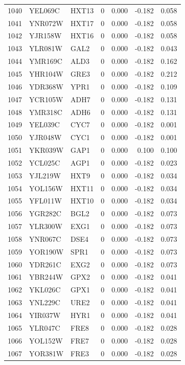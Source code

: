 \begin{longtable}{rllrrrr}
1040 & YEL069C & HXT13 & 0 & 0.000 & -0.182 & 0.058\\
1041 & YNR072W & HXT17 & 0 & 0.000 & -0.182 & 0.058\\
1042 & YJR158W & HXT16 & 0 & 0.000 & -0.182 & 0.058\\
1043 & YLR081W & GAL2 & 0 & 0.000 & -0.182 & 0.043\\
1044 & YMR169C & ALD3 & 0 & 0.000 & -0.182 & 0.162\\
1045 & YHR104W & GRE3 & 0 & 0.000 & -0.182 & 0.212\\
1046 & YDR368W & YPR1 & 0 & 0.000 & -0.182 & 0.109\\
1047 & YCR105W & ADH7 & 0 & 0.000 & -0.182 & 0.131\\
1048 & YMR318C & ADH6 & 0 & 0.000 & -0.182 & 0.131\\
1049 & YEL039C & CYC7 & 0 & 0.000 & -0.182 & 0.001\\
1050 & YJR048W & CYC1 & 0 & 0.000 & -0.182 & 0.001\\
1051 & YKR039W & GAP1 & 0 & 0.000 & 0.100 & 0.100\\
1052 & YCL025C & AGP1 & 0 & 0.000 & -0.182 & 0.023\\
1053 & YJL219W & HXT9 & 0 & 0.000 & -0.182 & 0.034\\
1054 & YOL156W & HXT11 & 0 & 0.000 & -0.182 & 0.034\\
1055 & YFL011W & HXT10 & 0 & 0.000 & -0.182 & 0.034\\
1056 & YGR282C & BGL2 & 0 & 0.000 & -0.182 & 0.073\\
1057 & YLR300W & EXG1 & 0 & 0.000 & -0.182 & 0.073\\
1058 & YNR067C & DSE4 & 0 & 0.000 & -0.182 & 0.073\\
1059 & YOR190W & SPR1 & 0 & 0.000 & -0.182 & 0.073\\
1060 & YDR261C & EXG2 & 0 & 0.000 & -0.182 & 0.073\\
1061 & YBR244W & GPX2 & 0 & 0.000 & -0.182 & 0.041\\
1062 & YKL026C & GPX1 & 0 & 0.000 & -0.182 & 0.041\\
1063 & YNL229C & URE2 & 0 & 0.000 & -0.182 & 0.041\\
1064 & YIR037W & HYR1 & 0 & 0.000 & -0.182 & 0.041\\
1065 & YLR047C & FRE8 & 0 & 0.000 & -0.182 & 0.028\\
1066 & YOL152W & FRE7 & 0 & 0.000 & -0.182 & 0.028\\
1067 & YOR381W & FRE3 & 0 & 0.000 & -0.182 & 0.028\\

\end{longtable}

